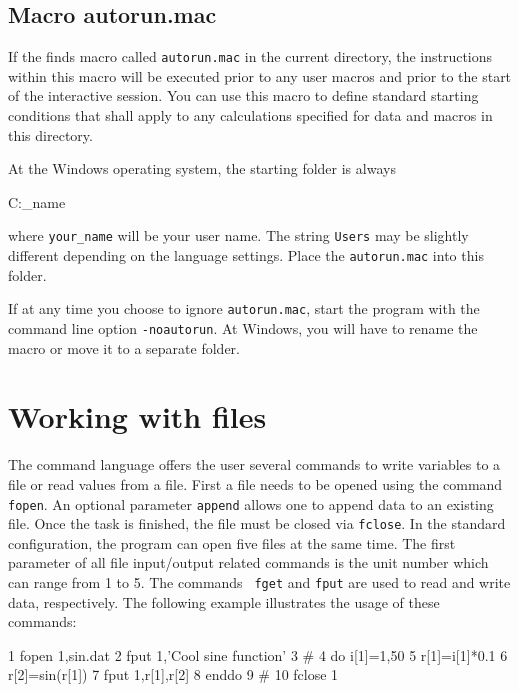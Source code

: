 \subsection{Macro autorun.mac}
If the \Suite finds macro called {\tt autorun.mac} in the current
directory, the instructions within this macro will be executed
prior to any user macros and prior to the start of the interactive 
session. You can use this macro to define standard starting 
conditions that shall apply to any calculations specified for data
and macros in this directory. 

At the Windows operating system, the starting folder is always \\
\begin{MacVerbatim}
   C:\Users\your_name
\end{MacVerbatim}
where {\tt your\_name} will be your user name. The string {\tt Users}
may be slightly different depending on the language settings.
Place the {\tt autorun.mac} into this folder.

If at any time you choose to ignore {\tt autorun.mac}, start the program 
with the command line option {\tt -noautorun}. At Windows, you will have to 
rename the macro or move it to a separate folder. 



\section{Working with files \label{io}}

The command language offers the user several commands to write
variables to a file or read values from a file. First a file needs
to be opened using the command {\tt fopen}. An optional parameter
{\tt append} allows one to append data to an existing file. Once the
task is finished, the file must be closed via {\tt fclose}. In the
standard configuration, the program can open five files at the same
time. The first parameter of all file input/output related commands
is the unit number which can range from 1 to 5. The commands {\tt
fget} and {\tt fput} are used to read and write data, respectively.
The following example illustrates the usage of these commands:

\footnotesize
\begin{MacVerbatim}
      1  fopen 1,sin.dat
      2  fput 1,'Cool sine function'
      3  #
      4  do i[1]=1,50
      5     r[1]=i[1]*0.1
      6     r[2]=sin(r[1])
      7     fput 1,r[1],r[2]
      8  enddo
      9  #
     10  fclose 1
\end{MacVerbatim}
\normalsize

